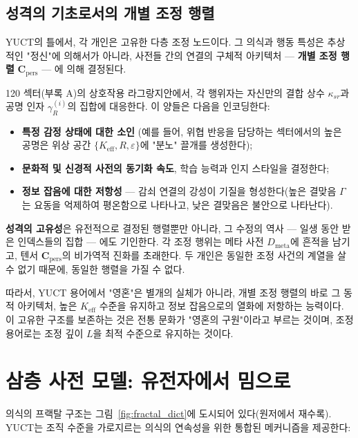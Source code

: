 \documentclass[12pt,a4paper]{article}
\begin{document}
	\subsection{성격의 기초로서의 개별 조정 행렬}
	\label{subsec:personality-matrix}
	
	YUCT의 틀에서, 각 개인은 고유한 다층 조정 노드이다. 그 의식과 행동 특성은 추상적인 "정신"에 의해서가 아니라, 사전들 간의 연결의 구체적 아키텍처 — \textbf{개별 조정 행렬} \(\mathbf{C}_{\text{pers}}\) — 에 의해 결정된다.
	
	120 섹터(부록 A)의 상호작용 라그랑지안에서, 각 행위자는 자신만의 결합 상수 \(\kappa_{sr}\)과 공명 인자 \(\gamma_{R}^{(i)}\)의 집합에 대응한다. 이 양들은 다음을 인코딩한다:
	\begin{itemize}
		\item \textbf{특정 감정 상태에 대한 소인} (예를 들어, 위협 반응을 담당하는 섹터에서의 높은 공명은 위상 공간 \(\{K_{\mathrm{eff}}, R, \varepsilon\}\)에 "분노" 끌개를 생성한다);
		\item \textbf{문화적 및 신경적 사전의 동기화 속도}, 학습 능력과 인지 스타일을 결정한다;
		\item \textbf{정보 잡음에 대한 저항성} — 감쇠 연결의 강성이 기질을 형성한다(높은 결맞음 \(\Gamma\)는 요동을 억제하여 평온함으로 나타나고, 낮은 결맞음은 불안으로 나타난다).
	\end{itemize}
	
	\textbf{성격의 고유성}은 유전적으로 결정된 행렬뿐만 아니라, 그 수정의 역사 — 일생 동안 받은 인덱스들의 집합 — 에도 기인한다. 각 조정 행위는 메타 사전 \(D_{\text{meta}}\)에 흔적을 남기고, 텐서 \(\mathbf{C}_{\text{pers}}\)의 비가역적 진화를 초래한다. 두 개인은 동일한 조정 사건의 계열을 살 수 없기 때문에, 동일한 행렬을 가질 수 없다.
	
	따라서, YUCT 용어에서 "영혼"은 별개의 실체가 아니라, 개별 조정 행렬의 바로 그 동적 아키텍처, 높은 \(K_{\mathrm{eff}}\) 수준을 유지하고 정보 잡음으로의 열화에 저항하는 능력이다. 이 고유한 구조를 보존하는 것은 전통 문화가 "영혼의 구원"이라고 부르는 것이며, 조정 용어로는 조정 깊이 \(L\)을 최적 수준으로 유지하는 것이다.
	
	\section{삼층 사전 모델: 유전자에서 밈으로}
	
	의식의 프랙탈 구조는 그림~\ref{fig:fractal_dict}에 도시되어 있다(원저에서 재수록). YUCT는 조직 수준을 가로지르는 의식의 연속성을 위한 통합된 메커니즘을 제공한다:
	
\end{document}
